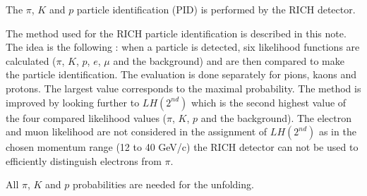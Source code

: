 \documentclass[letterpaper,12pt]{article}
\begin{document}
The $\pi$, $K$ and $p$ particle identification (PID) is performed by the RICH detector.

The method used for the RICH particle identification is described in this note\cite{RICH_NOTE}. The idea is the following : when a particle
is detected, six likelihood functions are calculated ($\pi$, $K$, $p$, $e$, $\mu$ and the background) and are then
compared to make the particle identification. The evaluation is done separately for pions, kaons and protons. The largest
value corresponds to the maximal probability. The method is improved by looking further to $LH(2^{nd})$ which is the second
highest value of the four compared likelihood values ($\pi$, $K$, $p$ and the background). The electron and muon likelihood
are not considered in the assignment of $LH(2^{nd})$ as in the chosen momentum range (12 to 40 GeV/c) the RICH detector can
not be used to efficiently distinguish electrons from $\pi$.

All $\pi$, $K$ and $p$ probabilities are needed for the unfolding.
\end{document}
